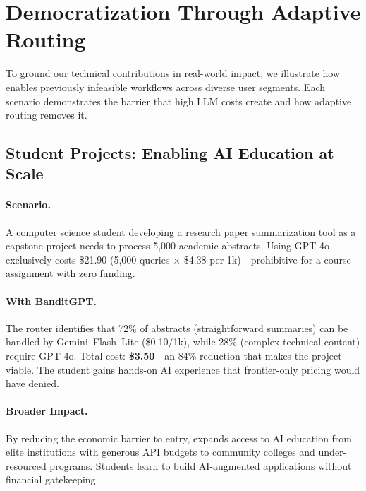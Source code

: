 
\section{Democratization Through Adaptive Routing}
\label{sec:use_cases}

To ground our technical contributions in real-world impact, we illustrate how \ours{} enables previously infeasible workflows across diverse user segments. Each scenario demonstrates the barrier that high LLM costs create and how adaptive routing removes it.

\subsection{Student Projects: Enabling AI Education at Scale}

\paragraph{Scenario.} A computer science student developing a research paper summarization tool as a capstone project needs to process 5,000 academic abstracts. Using GPT-4o exclusively costs \$21.90 (5,000 queries × \$4.38 per 1k)---prohibitive for a course assignment with zero funding.

\paragraph{With BanditGPT.} The router identifies that 72\% of abstracts (straightforward summaries) can be handled by Gemini~Flash~Lite (\$0.10/1k), while 28\% (complex technical content) require GPT-4o. Total cost: \textbf{\$3.50}---an 84\% reduction that makes the project viable. The student gains hands-on AI experience that frontier-only pricing would have denied.

\paragraph{Broader Impact.} By reducing the economic barrier to entry, \ours{} expands access to AI education from elite institutions with generous API budgets to community colleges and under-resourced programs. Students learn to build AI-augmented applications without financial gatekeeping.

